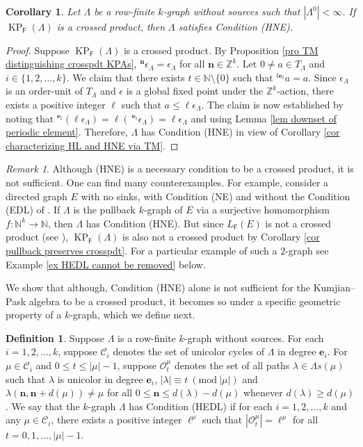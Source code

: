 \documentclass[a4paper,reqno,12pt]{amsart}
\numberwithin{equation}{section}
\newtheorem{cor}[thm]{Corollary}
\theoremstyle{definition}
\newtheorem{dfn}[thm]{Definition}
\theoremstyle{remark}
\newtheorem{rmk}[thm]{Remark}
\newcommand{\KP}{\operatorname{KP}}
\newcommand{\N}{\mathbf{n}}
\begin{document}
\begin{cor}\label{cor HNE is necessary to be crosspdt}
Let $\Lambda$ be a row-finite $k$-graph without sources such that $|\Lambda^0|< \infty$. If $\KP_\mathsf{F}(\Lambda)$ is a crossed product, then $\Lambda$ satisfies Condition \textup{(HNE)}.
\end{cor}
\begin{proof}
Suppose $\KP_\mathsf{F}(\Lambda)$ is a crossed product. By Proposition \ref{pro TM distinguishing crosspdt KPAs}, $^\N \epsilon_\Lambda=\epsilon_\Lambda$ for all $\N\in \mathbb{Z}^k$. Let $0\neq a\in T_\Lambda$ and $i\in \{1,2,\ldots,k\}$. We claim that there exists $t\in \mathbb{N}\setminus \{0\}$ such that $^{t\mathbf{e}_i}a=a$. Since $\epsilon_\Lambda$ is an order-unit of $T_\Lambda$ and $\epsilon$ is a global fixed point under the $\mathbb{Z}^k$-action, there exists a positive integer $\ell$ such that $a\le \ell \epsilon_\Lambda$. The claim is now established by noting that $^{\mathbf{e}_i}(\ell\epsilon_\Lambda)=\ell(~^{\mathbf{e}_i}\epsilon_\Lambda)=\ell \epsilon_\Lambda$ and using Lemma \ref{lem downset of periodic element}. Therefore, $\Lambda$ has Condition (HNE) in view of Corollary \ref{cor characterizing HL and HNE via TM}.  
\end{proof}
\begin{rmk}\label{rem HNE is not sufficient for crosspdt}
Although (HNE) is a necessary condition to be a crossed product, it is not sufficient. One can find many counterexamples. For example, consider a directed graph $E$ with no sinks, with Condition (NE) and without the Condition (EDL) of \cite{Vas}. If $\Lambda$ is the pullback $k$-graph of $E$ via a surjective homomorphism $f:\mathbb{N}^k\longrightarrow \mathbb{N}$, then $\Lambda$ has Condition (HNE). But since $L_\mathsf{F}(E)$ is not a crossed product (see \cite[Theorem 3.1]{Vas}), $\KP_\mathsf{F}(\Lambda)$ is also not a crossed product by Corollary \ref{cor pullback preserves crosspdt}. For a particular example of such a $2$-graph see Example \ref{ex HEDL cannot be removed} below. 
\end{rmk}

We show that although, Condition (HNE) alone is not sufficient for the Kumjian--Pask algebra to be a crossed product, it becomes so under a specific geometric property of a $k$-graph, which we define next.

\begin{dfn}\label{def Condition HEDL}
Suppose $\Lambda$ is a row-finite $k$-graph without sources. For each $i=1,2,\ldots,k$, suppose $\mathcal{C}_i$ denotes the set of unicolor cycles of $\Lambda$ in degree $\mathbf{e}_i$. For $\mu\in \mathcal{C}_i$ and $0\le t\le |\mu|-1$, suppose $\mathcal{O}_t^\mu$ denotes the set of all paths $\lambda\in \Lambda s(\mu)$ such that $\lambda$ is unicolor in degree $\mathbf{e}_i$, $|\lambda|\equiv t ~(\text{mod}~|\mu|)$ and $\lambda(\N,\N+d(\mu))\neq \mu$ for all $0\le \N\le d(\lambda)-d(\mu)$ whenever $d(\lambda)\ge d(\mu)$. We say that the $k$-graph $\Lambda$ has Condition (HEDL) if for each $i=1,2,\ldots,k$ and any $\mu\in \mathcal{C}_i$, there exists a positive integer $\ell^\mu$ such that $|\mathcal{O}_t^\mu|=\ell^\mu$ for all $t=0,1,\ldots,|\mu|-1$.      
\end{dfn}
\end{document}
